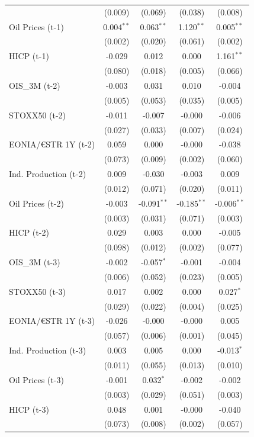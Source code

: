 \begin{longtable}[t]{lcccc}
 & (0.009) & (0.069) & (0.038) & (0.008)\\
Oil Prices (t-1) & 0.004$^{**}$ & 0.063$^{**}$ & 1.120$^{**}$ & 0.005$^{**}$\\
 & (0.002) & (0.020) & (0.061) & (0.002)\\
HICP (t-1) & -0.029 & 0.012 & 0.000 & 1.161$^{**}$\\
 & (0.080) & (0.018) & (0.005) & (0.066)\\
OIS\_3M (t-2) & -0.003 & 0.031 & 0.010 & -0.004\\
 & (0.005) & (0.053) & (0.035) & (0.005)\\
STOXX50 (t-2) & -0.011 & -0.007 & -0.000 & -0.006\\
 & (0.027) & (0.033) & (0.007) & (0.024)\\
EONIA/€STR 1Y (t-2) & 0.059 & 0.000 & -0.000 & -0.038\\
 & (0.073) & (0.009) & (0.002) & (0.060)\\
Ind. Production (t-2) & 0.009 & -0.030 & -0.003 & 0.009\\
 & (0.012) & (0.071) & (0.020) & (0.011)\\
Oil Prices (t-2) & -0.003 & -0.091$^{**}$ & -0.185$^{**}$ & -0.006$^{**}$\\
 & (0.003) & (0.031) & (0.071) & (0.003)\\
HICP (t-2) & 0.029 & 0.003 & 0.000 & -0.005\\
 & (0.098) & (0.012) & (0.002) & (0.077)\\
OIS\_3M (t-3) & -0.002 & -0.057$^{*}$ & -0.001 & -0.004\\
 & (0.006) & (0.052) & (0.023) & (0.005)\\
STOXX50 (t-3) & 0.017 & 0.002 & 0.000 & 0.027$^{*}$\\
 & (0.029) & (0.022) & (0.004) & (0.025)\\
EONIA/€STR 1Y (t-3) & -0.026 & -0.000 & -0.000 & 0.005\\
 & (0.057) & (0.006) & (0.001) & (0.045)\\
Ind. Production (t-3) & 0.003 & 0.005 & 0.000 & -0.013$^{*}$\\
 & (0.011) & (0.055) & (0.013) & (0.010)\\
Oil Prices (t-3) & -0.001 & 0.032$^{*}$ & -0.002 & -0.002\\
 & (0.003) & (0.029) & (0.051) & (0.003)\\
HICP (t-3) & 0.048 & 0.001 & -0.000 & -0.040\\
 & (0.073) & (0.008) & (0.002) & (0.057)\\

\end{longtable}
